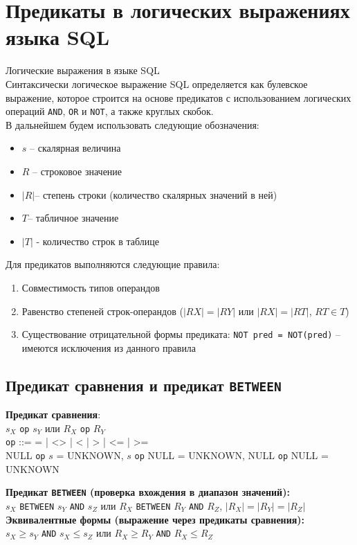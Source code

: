 \documentclass[a4paper,12pt]{article}
\begin{document}
\section{Предикаты в логических выражениях языка SQL}

Логические выражения в языке SQL\\
Синтаксически логическое выражение SQL определяется как булевское выражение, которое строится на основе предикатов с использованием логических операций \texttt{AND}, \texttt{OR} и \texttt{NOT}, а также круглых скобок.\\
В дальнейшем будем использовать следующие обозначения:
\begin{itemize}
    \item $s$ – скалярная величина
    \item $R$ – строковое значение
    \item $|R|$– степень строки (количество скалярных значений в ней)
    \item $T$– табличное значение
    \item $|T|$ - количество строк в таблице
\end{itemize}

Для предикатов выполняются следующие правила:
\begin{enumerate}
    \item Совместимость типов операндов
    \item Равенство степеней строк-операндов ($|RX| = |RY|$ или $|RX| = |RT|$, $RT \in T$)
    \item Существование отрицательной формы предиката: \texttt{NOT pred = NOT(pred)} – имеются исключения из данного правила
\end{enumerate}

\subsection{Предикат сравнения и предикат \texttt{BETWEEN}}

\textbf{Предикат сравнения}:\\
$s_X$ \texttt{op} $s_Y$ или $R_X$ \texttt{op} $R_Y$\\
\texttt{op} ::= = | <> | < | > | <= | >=\\
NULL \texttt{op} $s$ = UNKNOWN, $s$ \texttt{op} NULL = UNKNOWN, NULL \texttt{op} NULL = UNKNOWN

\textbf{Предикат \texttt{BETWEEN} (проверка вхождения в диапазон значений):}\\
$s_X$ \texttt{BETWEEN} $s_Y$ \texttt{AND} $s_Z$ или $R_X$ \texttt{BETWEEN} $R_Y$ \texttt{AND} $R_Z$, $|R_X| = |R_Y| = |R_Z|$\\
\textbf{Эквивалентные формы (выражение через предикаты сравнения):}\\
$s_X \geq s_Y$ \texttt{AND} $s_X \leq s_Z$ или $R_X \geq R_Y$ \texttt{AND} $R_X \leq R_Z$
\end{document}

